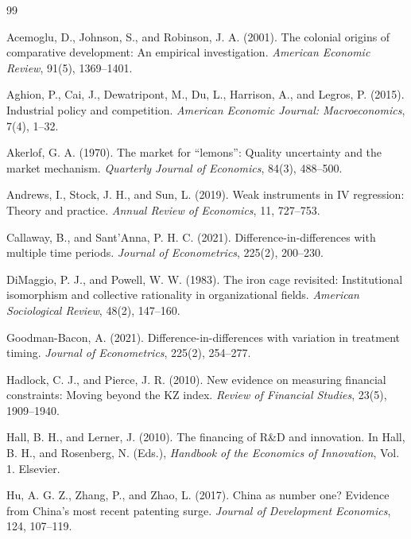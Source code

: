 \documentclass[12pt]{article}
\begin{document}
\clearpage
\begin{thebibliography}{99}

Acemoglu, D., Johnson, S., and Robinson, J. A. (2001).
The colonial origins of comparative development: An empirical investigation.
\textit{American Economic Review}, 91(5), 1369--1401.

Aghion, P., Cai, J., Dewatripont, M., Du, L., Harrison, A., and Legros, P. (2015).
Industrial policy and competition.
\textit{American Economic Journal: Macroeconomics}, 7(4), 1--32.

Akerlof, G. A. (1970).
The market for ``lemons'': Quality uncertainty and the market mechanism.
\textit{Quarterly Journal of Economics}, 84(3), 488--500.

Andrews, I., Stock, J. H., and Sun, L. (2019).
Weak instruments in IV regression: Theory and practice.
\textit{Annual Review of Economics}, 11, 727--753.

Callaway, B., and Sant'Anna, P. H. C. (2021).
Difference-in-differences with multiple time periods.
\textit{Journal of Econometrics}, 225(2), 200--230.

DiMaggio, P. J., and Powell, W. W. (1983).
The iron cage revisited: Institutional isomorphism and collective rationality in organizational fields.
\textit{American Sociological Review}, 48(2), 147--160.

Goodman-Bacon, A. (2021).
Difference-in-differences with variation in treatment timing.
\textit{Journal of Econometrics}, 225(2), 254--277.

Hadlock, C. J., and Pierce, J. R. (2010).
New evidence on measuring financial constraints: Moving beyond the KZ index.
\textit{Review of Financial Studies}, 23(5), 1909--1940.

Hall, B. H., and Lerner, J. (2010).
The financing of R\&D and innovation.
In Hall, B. H., and Rosenberg, N. (Eds.), \textit{Handbook of the Economics of Innovation}, Vol. 1.
Elsevier.

Hu, A. G. Z., Zhang, P., and Zhao, L. (2017).
China as number one? Evidence from China's most recent patenting surge.
\textit{Journal of Development Economics}, 124, 107--119.


\end{thebibliography}
\end{document}
